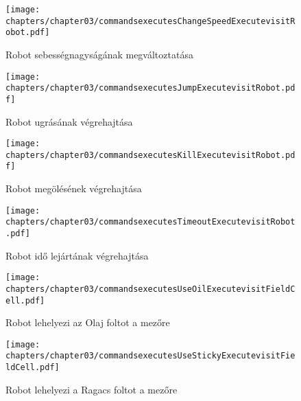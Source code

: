 \begin{itemize}
\begin{figure}[h]
	\begin{center}
		\texttt{[image: chapters/chapter03/commandsexecutesChangeSpeedExecutevisitRobot.pdf]}
		\caption{Robot sebességnagyságának megváltoztatása}
		\label{fig:command.executes.ChangeSpeedExecute.visit}
	\end{center}
\end{figure}

\begin{figure}[h]
	\begin{center}
		\texttt{[image: chapters/chapter03/commandsexecutesJumpExecutevisitRobot.pdf]}
		\caption{Robot ugrásának végrehajtása}
		\label{fig:command.executes.JumpExecute.visit}
	\end{center}
\end{figure}

\begin{figure}[h]
	\begin{center}
		\texttt{[image: chapters/chapter03/commandsexecutesKillExecutevisitRobot.pdf]}
		\caption{Robot megölésének végrehajtása}
		\label{fig:command.executes.KillExecute.visit}
	\end{center}
\end{figure}

\begin{figure}[h]
	\begin{center}
		\texttt{[image: chapters/chapter03/commandsexecutesTimeoutExecutevisitRobot.pdf]}
		\caption{Robot idő lejártának végrehajtása}
		\label{fig:command.executes.TimeoutExecute.visit}
	\end{center}
\end{figure}

\begin{figure}[h]
	\begin{center}
		\texttt{[image: chapters/chapter03/commandsexecutesUseOilExecutevisitFieldCell.pdf]}
		\caption{Robot lehelyezi az Olaj foltot a mezőre}
		\label{fig:command.executes.UseOilExecute.visit}
	\end{center}
\end{figure}

\begin{figure}[h]
	\begin{center}
		\texttt{[image: chapters/chapter03/commandsexecutesUseStickyExecutevisitFieldCell.pdf]}
		\caption{Robot lehelyezi a Ragacs foltot a mezőre}
		\label{fig:command.executes.UseStickyExecute.visit}
	\end{center}
\end{figure}


\end{itemize}
